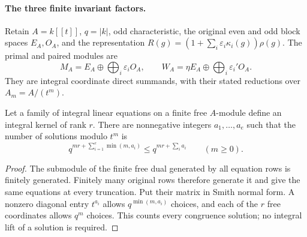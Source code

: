 \paragraph{The three finite invariant factors.}
Retain $A=k[[t]]$, $q=|k|$, odd characteristic, the original even and
odd block spaces $E_A,O_A$, and the representation
$R(g)=(1+\sum_i\varepsilon_i\kappa_i(g))\rho(g)$.
The primal and paired modules are
\[
 M_A=E_A\oplus\bigoplus_i\varepsilon_iO_A,
 \qquad W_A=\eta E_A\oplus\bigoplus_i\varepsilon_i'O_A.
\]
They are integral coordinate direct summands, with their stated
reductions over $A_m=A/(t^m)$.

\begin{lemma}
\label{lem:selmer-finite-invariant-count}
Let a family of integral linear equations on a finite free $A$-module
define an integral kernel of rank $r$. There are nonnegative integers
$a_1,\ldots,a_e$ such that the number of solutions modulo $t^m$ is
\[
                  q^{mr+\sum_{i=1}^e\min(m,a_i)}
                  \leq q^{mr+\sum_i a_i}\qquad(m\geq0).
\]
\end{lemma}
\begin{proof}
The submodule of the finite free dual generated by all equation rows
is finitely generated. Finitely many original rows therefore generate
it and give the same equations at every truncation. Put their matrix
in Smith normal form. A nonzero diagonal entry $t^{a_i}$ allows
$q^{\min(m,a_i)}$ choices, and each of the $r$ free coordinates
allows $q^m$ choices. This counts every congruence solution; no
integral lift of a solution is required.
\end{proof}

